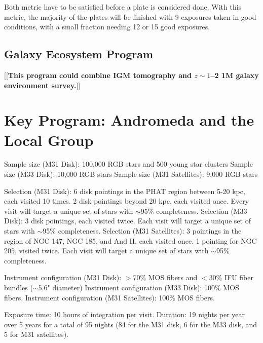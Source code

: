 \documentclass[11pt,a4paper,twoside,onecolumn,openany,final,oldfontcommands]{memoir}
\newcommand{\edit}[2][todo]{{\color{#1}[[{\bf #2}]]}}
\begin{document}
Both metric have to be satisfied before a plate is considered done. With this metric, the majority of the plates will be finished with 9 exposures taken in good conditions, with a small fraction needing 12 or 15 good exposures. 


\section{Galaxy Ecosystem Program}\label{prog:ecosystem}

\edit{This program could combine IGM tomography and $z \sim 1$--2 1M galaxy environment survey.}



\newpage

\chapter{Key Program: Andromeda and the Local Group}\label{prog:localgroup}

\begin{programrequirement}

\reqitem Sample size (M31 Disk): 100,000 RGB stars and 500 young star clusters
\reqitem Sample size (M33 Disk): 10,000 RGB stars
\reqitem Sample size (M31 Satellites): 9,000 RGB stars

\reqitem Selection (M31 Disk): 6 disk pointings in the PHAT region between 5-20 kpc, each visited 10 times. 2 disk pointings beyond 20 kpc, each visited once. Every visit will target a unique set of stars with $\sim$95\% completeness.
\reqitem Selection (M33 Disk): 3 disk pointings, each visited twice. Each visit will target a unique set of stars with $\sim$95\% completeness.
\reqitem Selection (M31 Satellites): 3 pointings in the region of NGC 147, NGC 185, and And II, each visited once. 1 pointing for NGC 205, visited twice. Each visit will target a unique set of stars with $\sim$95\% completeness.

\reqitem Instrument configuration (M31 Disk): $>$70\% MOS fibers and $<$30\% IFU fiber bundles ($\sim$5.6" diameter)
\reqitem Instrument configuration (M33 Disk): 100\% MOS fibers.
\reqitem Instrument configuration (M31 Satellites): 100\% MOS fibers.

\reqitem Exposure time: 10 hours of integration per visit.
\reqitem Duration: 19 nights per year over 5 years for a total of 95 nights (84 for the M31 disk, 6 for the M33 disk, and 5 for M31 satellites).

\end{programrequirement}
\end{document}

